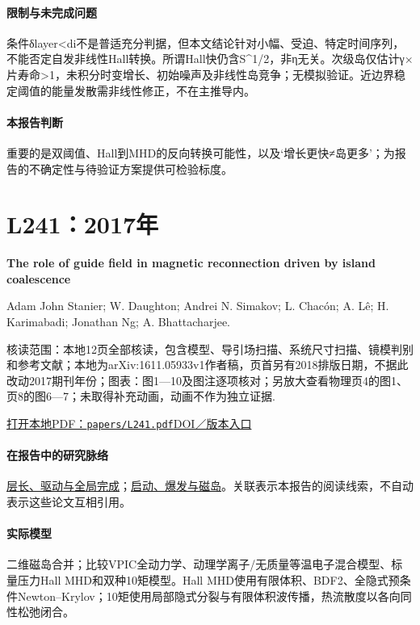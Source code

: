 \paragraph{限制与未完成问题}条件δlayer<di不是普适充分判据，但本文结论针对小幅、受迫、特定时间序列，不能否定自发非线性Hall转换。所谓Hall快仍含S\textasciicircum{}1/2，非η无关。次级岛仅估计γ×片寿命>1，未积分时变增长、初始噪声及非线性岛竞争；无模拟验证。近边界稳定阈值的能量发散需非线性修正，不在主推导内。

\paragraph{本报告判断}重要的是双阈值、Hall到MHD的反向转换可能性，以及‘增长更快≠岛更多’；为报告的不确定性与待验证方案提供可检验标度。

\section{L241：2017年}\label{paper:L241}

\textbf{The role of guide field in magnetic reconnection driven by island coalescence}\citep{L241}\

Adam  John Stanier;  W. Daughton;  Andrei N. Simakov;  L. Chacón;  A. Lê;  H. Karimabadi;  Jonathan Ng;  A. Bhattacharjee.

\textsf{核读范围：}本地12页全部核读，包含模型、导引场扫描、系统尺寸扫描、镜模判别和参考文献；本地为arXiv:1611.05933v1作者稿，页首另有2018排版日期，不据此改动2017期刊年份；\textsf{图表：}图1—10及图注逐项核对；另放大查看物理页4的图1、页8的图6—7；未取得补充动画，动画不作为独立证据.

\href{run:papers/L241.pdf}{打开本地PDF：\texttt{papers/L241.pdf}}\quad\href{https://doi.org/10.1063/1.4976712}{DOI／版本入口}

\paragraph{在报告中的研究脉络}\hyperref[story:global]{层长、驱动与全局完成}；\hyperref[story:onset]{启动、爆发与磁岛}。关联表示本报告的阅读线索，不自动表示这些论文互相引用。

\paragraph{实际模型}二维磁岛合并；比较VPIC全动力学、动理学离子/无质量等温电子混合模型、标量压力Hall MHD和双种10矩模型。Hall MHD使用有限体积、BDF2、全隐式预条件Newton–Krylov；10矩使用局部隐式分裂与有限体积波传播，热流散度以各向同性松弛闭合。

